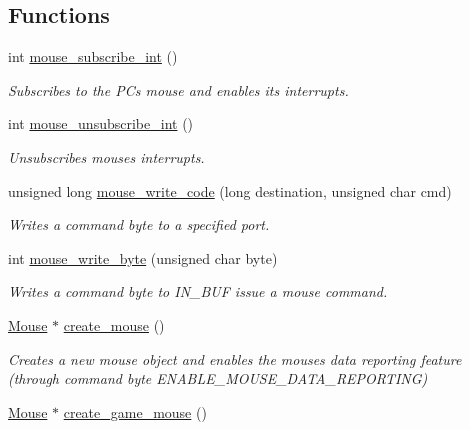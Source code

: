 \subsection*{Functions}
\begin{DoxyCompactItemize}
\item 
int \hyperlink{group__mouse_ga99506573209b197b84ee22a228b89fbd}{mouse\+\_\+subscribe\+\_\+int} ()
\begin{DoxyCompactList}\small\item\em Subscribes to the PC\textquotesingle{}s mouse and enables its interrupts. \end{DoxyCompactList}\item 
int \hyperlink{group__mouse_ga685ad2706aca36d9869a30a19b9f446a}{mouse\+\_\+unsubscribe\+\_\+int} ()
\begin{DoxyCompactList}\small\item\em Unsubscribes mouse\textquotesingle{}s interrupts. \end{DoxyCompactList}\item 
unsigned long \hyperlink{group__mouse_ga43b4571e0c6a80c0a0b65c75ee72762e}{mouse\+\_\+write\+\_\+code} (long destination, unsigned char cmd)
\begin{DoxyCompactList}\small\item\em Writes a command byte to a specified port. \end{DoxyCompactList}\item 
int \hyperlink{group__mouse_gae4dd0dac34bd9ca58faf21a9f181a00d}{mouse\+\_\+write\+\_\+byte} (unsigned char byte)
\begin{DoxyCompactList}\small\item\em Writes a command byte to I\+N\+\_\+\+B\+UF issue a mouse command. \end{DoxyCompactList}\item 
\hyperlink{struct_mouse}{Mouse} $\ast$ \hyperlink{group__mouse_ga746cb478532b016b28ad06f8e03b22bc}{create\+\_\+mouse} ()
\begin{DoxyCompactList}\small\item\em Creates a new mouse \textquotesingle{}object\textquotesingle{} and enables the mouse\textquotesingle{}s data reporting feature (through command byte E\+N\+A\+B\+L\+E\+\_\+\+M\+O\+U\+S\+E\+\_\+\+D\+A\+T\+A\+\_\+\+R\+E\+P\+O\+R\+T\+I\+NG) \end{DoxyCompactList}\item 
\hyperlink{struct_mouse}{Mouse} $\ast$ \hyperlink{group__mouse_gaba19df7ff1055c560171ddffd5026aef}{create\+\_\+game\+\_\+mouse} ()

\end{DoxyCompactItemize}
